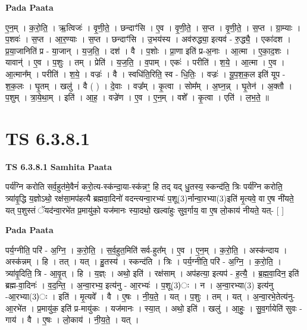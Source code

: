 \documentclass[17pt]{extarticle}
\begin{document}
\textbf{Pada Paata} \newline

ए॒न॒म् । क॒रो॒ति॒ । ऋ॒त्विजः॑ । वृ॒णी॒ते॒ । छन्दाꣳ॑सि । ए॒व । वृ॒णी॒ते॒ । स॒प्त । वृ॒णी॒ते॒ । स॒प्त । ग्रा॒म्याः । प॒शवः॑ । स॒प्त । आ॒र॒ण्याः । स॒प्त । छन्दाꣳ॑सि । उ॒भय॑स्य । अव॑रुद्ध्या॒ इत्यव॑ - रु॒द्ध्यै॒ । एका॑दश । प्र॒या॒जानिति॑ प्र - या॒जान् । य॒ज॒ति॒ । दश॑ । वै । प॒शोः । प्रा॒णा इति॑ प्र-अ॒नाः । आ॒त्मा । ए॒का॒द॒शः । यावान्॑ । ए॒व । प॒शुः । तम् । प्रेति॑ । य॒ज॒ति॒ । व॒पाम् । एकः॑ । परीति॑ । श॒ये॒ । आ॒त्मा । ए॒व । आ॒त्मान᳚म् । परीति॑ । श॒ये॒ । वज्रः॑ । वै । स्वधि॑ति॒रिति॒ स्व - धि॒तिः॒ । वज्रः॑ । यू॒प॒श॒क॒ल इति॑ यूप - श॒क॒लः । घृ॒तम् । खलु॑ । वै ( ) । दे॒वाः । वज्र᳚म् । कृ॒त्वा । सोम᳚म् । अ॒घ्न॒न्न् । घृ॒तेन॑ । अ॒क्तौ । प॒शुम् । त्रा॒ये॒था॒म् । इति॑ । आ॒ह॒ । वज्रे॑ण । ए॒व । ए॒न॒म् । वशे᳚ । कृ॒त्वा । एति॑ । ल॒भ॒ते॒ ॥  \newline




\section*{ TS 6.3.8.1 }

\textbf{TS 6.3.8.1 } \newline
\textbf{Samhita Paata} \newline

पर्य॑ग्नि करोति सर्व॒हुत॑मे॒वैनं॑ करो॒त्य-स्क॑न्दा॒या-स्क॑न्नꣳ॒॒ हि तद् यद् धु॒तस्य॒ स्कन्द॑ति॒ त्रिः पर्य॑ग्नि करोति॒ त्र्या॑वृ॒द्धि य॒ज्ञोऽथो॒ रक्ष॑सा॒मप॑हत्यै ब्रह्मवा॒दिनो॑ वदन्त्यन्वा॒रभ्यः॑ प॒शू(3)र्नान्वा॒रभ्या(3)इति॑ मृ॒त्यवे॒ वा ए॒ष नी॑यते॒ यत् प॒शुस्तं ॅयद॑न्वा॒रभे॑त प्र॒मायु॑को॒ यज॑मानः स्या॒दथो॒ खल्वा॑हुः सुव॒र्गाय॒ वा ए॒ष लो॒काय॑ नीयते॒ यत्- [  ] \newline

\textbf{Pada Paata} \newline

पर्य॒ग्नीति॒ परि॑ - अ॒ग्नि॒ । क॒रो॒ति॒ । स॒र्व॒हुत॒मिति॑ सर्व-हुत᳚म् । ए॒व । ए॒न॒म् । क॒रो॒ति॒ । अस्क॑न्दाय । अस्क॑न्नम् । हि । तत् । यत् । हु॒तस्य॑ । स्कन्द॑ति । त्रिः । पर्य॒ग्नीति॒ परि॑ - अ॒ग्नि॒ । क॒रो॒ति॒ । त्र्या॑वृ॒दिति॒ त्रि - आ॒वृ॒त् । हि । य॒ज्ञ्ः । अथो॒ इति॑ । रक्ष॑साम् । अप॑हत्या॒ इत्यप॑ - ह॒त्यै॒ । ब्र॒ह्म॒वा॒दिन॒ इति॑ ब्रह्म-वा॒दिनः॑ । व॒द॒न्ति॒ । अ॒न्वा॒रभ्य॒ इत्य॑नु - आ॒रभ्यः॑ । प॒शू(3)ः । न । अ॒न्वा॒रभ्या(3) इत्य॑नु -आ॒रभ्या(3)ः । इति॑ । मृ॒त्यवे᳚ । वै । ए॒षः । नी॒य॒ते॒ । यत् ।  प॒शुः । तम् । यत् । अ॒न्वा॒रभे॒तेत्य॑नु-आ॒रभे॑त । प्र॒मायु॑क॒ इति॑ प्र-मायु॑कः । यज॑मानः । स्या॒त् । अथो॒ इति॑ । खलु॑ । आ॒हुः॒ । सु॒व॒र्गायेति॑ सुवः - गाय॑ । वै । ए॒षः । लो॒काय॑ । नी॒य॒ते॒ । यत् ।  \newline
\end{document}
